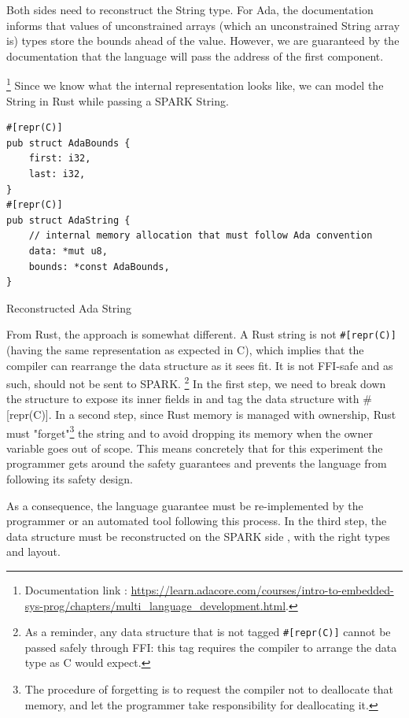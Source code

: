 \documentclass[nomenclature, english, bibtex]{kththesis}
\begin{document}
Both sides need to reconstruct the String type. For Ada, the documentation informs that values of unconstrained arrays (which an unconstrained String array is) types store the bounds ahead of the value. However, we are guaranteed by the documentation that the language will pass the address of the first component.{\footnote{Documentation link : \url{https://learn.adacore.com/courses/intro-to-embedded-sys-prog/chapters/multi\_language\_development.html}.} Since we know what the internal representation looks like, we can model the String in Rust while passing a SPARK String.

\begin{listing}[!ht]
\begin{verbatim}
#[repr(C)]
pub struct AdaBounds {
    first: i32,
    last: i32,
}
#[repr(C)]
pub struct AdaString {
    // internal memory allocation that must follow Ada convention
    data: *mut u8,
    bounds: *const AdaBounds,
}
\end{verbatim}
\caption[Reconstructed Ada String]{Reconstructed Ada String}
\label{lst:reconstructed_ada_string}
\end{listing}


From Rust, the approach is somewhat different. A Rust string is not \texttt{\#[repr(C)]} (having the same representation as expected in C), which implies that the compiler can rearrange the data structure as it sees fit. It is not \gls{FFI}-safe and as such, should not be sent to SPARK. \footnote{As a reminder, any data structure that is not tagged \texttt{\#[repr(C)]} cannot be passed safely through FFI: this tag requires the compiler to arrange the data type as C would expect.} In the first step, we need to break down the structure to expose its inner fields in  and tag the data structure with \#[repr(C)]. In a second step, since Rust memory is managed with ownership, Rust must "forget"\footnote{The procedure of forgetting is to request the compiler not to deallocate that memory, and let the programmer take responsibility for deallocating it.} the string and to avoid dropping its memory when the owner variable goes out of scope. This means concretely that for this experiment the programmer gets around the safety guarantees and prevents the language from following its safety design. 

As a consequence, the language guarantee must be re-implemented by the programmer or an automated tool following this process. 
In the third step, the data structure must be reconstructed on the SPARK side , with the right types and layout.


}
\end{document}
